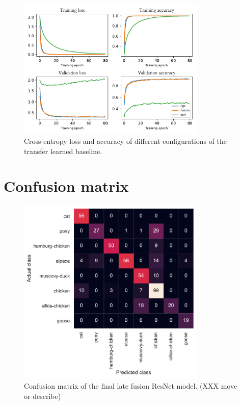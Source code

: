 \documentclass{l4proj}
\begin{document}
\begin{appendices}
\begin{figure}[ht]
  \centering
  \includegraphics[width=0.8\textwidth]{images/evaluation/baseline}
  \caption{Cross-entropy loss and accuracy of different configurations of the transfer learned baseline.}
  \label{fig:baseline_configs}
\end{figure}


\chapter{Confusion matrix}

\begin{figure}[ht]
  \centering
  \includegraphics[width=0.8\textwidth]{images/evaluation/confusion/final}
  \caption{Confusion matrix of the final late fusion ResNet model. (XXX move or describe)}
  \label{fig:confusion}
\end{figure}


\end{appendices}
\end{document}
